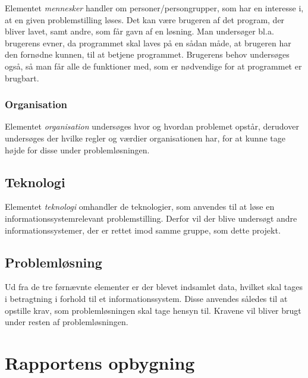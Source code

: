 Elementet \textit{mennesker} handler om personer/persongrupper, som har en interesse i, at en given problemstilling løses. 
Det kan være brugeren af det program, der bliver lavet, samt andre, som får gavn af en løsning.
Man undersøger bl.a. brugerens evner, da programmet skal laves på en sådan måde, at brugeren har den fornødne kunnen, til at betjene programmet.
Brugerens behov undersøges også, så man får alle de funktioner med, som er nødvendige for at programmet er brugbart.


\subsubsection{Organisation}\label{subsec:organisation}

Elementet \textit{organisation} undersøges hvor og hvordan problemet opstår, derudover undersøges der hvilke regler og værdier organisationen har, for at kunne tage højde for disse under problemløsningen.  


\subsection{Teknologi}\label{subsec:Teknologi}

Elementet \textit{teknologi} omhandler de teknologier, som anvendes til at løse en informationssystemrelevant problemstilling.
Derfor vil der blive undersøgt andre informationssystemer, der er rettet imod samme gruppe, som dette projekt.


\subsection{Problemløsning}
Ud fra de tre førnævnte elementer er der blevet indsamlet data, hvilket skal tages i betragtning i forhold til et informationssystem.
Disse anvendes således til at opstille krav, som problemløsningen skal tage hensyn til. 
Kravene vil bliver brugt under resten af problemløsningen.


\section{Rapportens opbygning}\label{sec:rapportens-opbygning}

